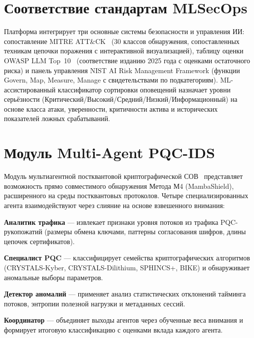 \section{Соответствие стандартам MLSecOps}
\label{sec:mlsecops}

Платформа интегрирует три основные системы безопасности и управления ИИ: сопоставление MITRE ATT\&CK~\cite{Hernandez2015} (30 классов обнаружения, сопоставленных техникам цепочки поражения с интерактивной визуализацией), таблицу оценки OWASP LLM Top~10~\cite{Xiong2020} (соответствие изданию 2025 года с оценками остаточного риска) и панель управления NIST AI Risk Management Framework (функции Govern, Map, Measure, Manage с свидетельствами по подкатегориям). ML-ассистированный классификатор сортировки оповещений назначает уровни серьёзности (Критический/Высокий/Средний/Низкий/Информационный) на основе класса атаки, уверенности, критичности актива и исторических показателей ложных срабатываний.


\section{Модуль Multi-Agent PQC-IDS}
\label{sec:pqc_module}

Модуль мультиагентной постквантовой криптографической СОВ~\cite{Anaedevha2026mapqc,NIST2024} представляет возможность прямо совместимого обнаружения Метода М4 (MambaShield), расширенного на среды постквантовых протоколов. Четыре специализированных агента взаимодействуют через слияние на основе взвешенного внимания:

\noindent\textbf{Аналитик трафика} --- извлекает признаки уровня потоков из трафика PQC-рукопожатий (размеры обмена ключами, паттерны согласования шифров, длины цепочек сертификатов).

\noindent\textbf{Специалист PQC} --- классифицирует семейства криптографических алгоритмов (CRYSTALS-Kyber, CRYSTALS-Dilithium, SPHINCS+, BIKE) и обнаруживает аномальные выборы параметров.

\noindent\textbf{Детектор аномалий} --- применяет анализ статистических отклонений тайминга потоков, энтропии полезной нагрузки и метаданных сессий.

\noindent\textbf{Координатор} --- объединяет выходы агентов через обученные веса внимания и формирует итоговую классификацию с оценками вклада каждого агента.

